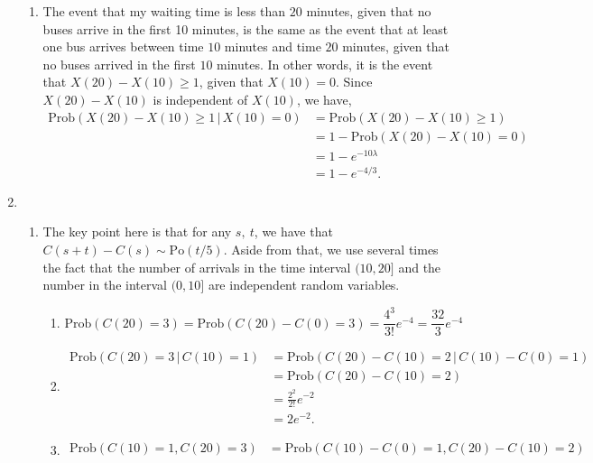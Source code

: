\documentclass[11pt,a4paper]{article}
\begin{document}
\begin{enumerate}
\begin{enumerate}
            \item The event that my waiting time is less than $20$ minutes, given that no buses arrive in the first 10 minutes, is the same as the event that at least one bus arrives between time $10$ minutes and time $20$ minutes, given that no buses arrived in the first $10$ minutes. In other words, it is the event that $X(20)-X(10)\geq 1$, given that $X(10) = 0$. Since $X(20)-X(10)$ is independent of $X(10)$, we have,
            \begin{align*}
                \text{Prob}(X(20)-X(10)\geq 1\,|\, X(10)=0)
                &= \text{Prob}(X(20)-X(10)\geq 1)\\
                &= 1-\text{Prob}(X(20)-X(10) = 0)\\
                &= 1-e^{-10\lambda}\\
                &= 1-e^{-4/3}.
            \end{align*}
        \end{enumerate}
        \item
        \begin{enumerate}
            \item The key point here is that for any $s,\ t$, we have that $C(s+t)-C(s)\sim \text{Po}(t/5)$. Aside from that, we use several times the fact that the number of arrivals in the time interval $(10,20]$ and the number in the interval $(0,10]$ are independent random variables.
            \begin{enumerate}
                \item
                $$
                \text{Prob}(C(20)=3)=\text{Prob}(C(20)-C(0)=3)=\frac{4^3}{3!}e^{-4}=\frac{32}{3}e^{-4}
                $$
                \item 
                \begin{align*}
                    \text{Prob}(C(20)=3\,|\, C(10)=1)
                    &= \text{Prob}(C(20)-C(10)=2\,|\, C(10)-C(0)=1)\\
                    &= \text{Prob}(C(20)-C(10)=2)\\
                    &= \frac{2^2}{2!}e^{-2}\\
                    &= 2e^{-2}.
                \end{align*}
                \item 
                \begin{align*}
                    \text{Prob}(C(10)=1,C(20)=3)
                    &= \text{Prob}(C(10)-C(0)=1, C(20)-C(10)=2)\\

\end{align*}
\end{enumerate}
\end{enumerate}
\end{enumerate}
\end{document}
